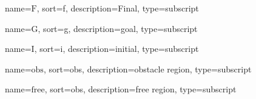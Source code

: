 
	{%
		name={\ensuremath{\mathrm{F}}},
		sort=f,
		description=Final,
		type=subscript
	}
	\newcommand{\final}{\gls{sub:final}}

	{%
		name={\ensuremath{\mathrm{G}}},
		sort=g,
		description=goal,
		type=subscript
	}
	\newcommand{\goal}{\gls{sub:goal}}

	{%
		name={\ensuremath{\mathrm{I}}},
		sort=i,
		description=initial,
		type=subscript
	}
	\newcommand{\initial}{\gls{sub:initial}}

	{%
		name={\ensuremath{\mathrm{obs}}},
		sort=obs,
		description=obstacle region,
		type=subscript
	}
	\newcommand{\obstacleregion}{\gls{sub:obstacleregion}}

	{%
		name={\ensuremath{\mathrm{free}}},
		sort=obs,
		description=free region,
		type=subscript
	}
	\newcommand{\freeregion}{\gls{sub:freeregion}}
